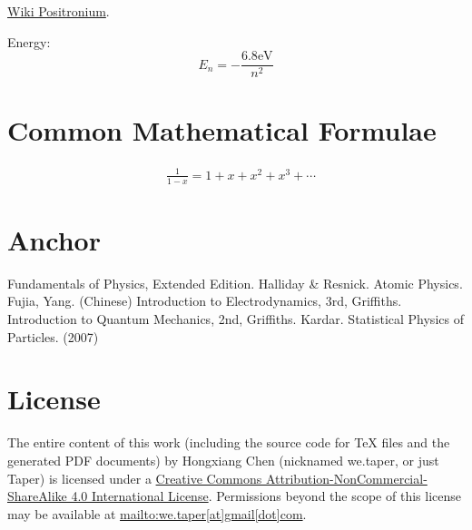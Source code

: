 \documentclass{article}
\numberwithin{equation}{subsection} %
\theoremstyle{definition}
\begin{document}
\href{https://en.wikipedia.org/wiki/Positronium}{Wiki Positronium}.

Energy:
\begin{equation}
    E_n = -\frac{6.8 \text{eV}}{n^2}
\end{equation}
\section{Common Mathematical Formulae}
\label{sec:Common-Mathematical-Formulae}
\begin{align}
    & \frac{1}{1-x} = 1 + x + x^2 + x^3 + \cdots
\end{align}

\section{Anchor}
\label{sec:anchor}
\begin{thebibliography}{1}
     Fundamentals of Physics, Extended Edition. Halliday
    \& Resnick.
     Atomic Physics. Fujia, Yang. (Chinese)
     Introduction to Electrodynamics, 3rd,
    Griffiths.
     Introduction to Quantum Mechanics, 2nd,
    Griffiths.
     Kardar. Statistical Physics of Particles. (2007)
\end{thebibliography}
\printnomenclature
\section{License}
The entire content of this work (including the source code
for TeX files and the generated PDF documents) by 
Hongxiang Chen (nicknamed we.taper, or just Taper) is
licensed under a 
\href{http://creativecommons.org/licenses/by-nc-sa/4.0/}{Creative 
Commons Attribution-NonCommercial-ShareAlike 4.0 International 
License}. Permissions beyond the scope of this 
license may be available at \url{mailto:we.taper[at]gmail[dot]com}.
\end{document}
